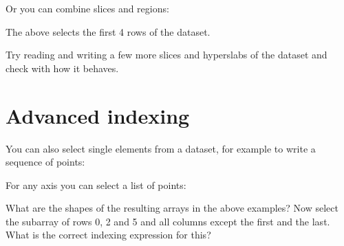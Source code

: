 \documentclass[letterpaper,10pt,english]{sphinxmanual}
\begin{document}
\sphinxAtStartPar
Or you can combine slices and regions:

\begin{sphinxVerbatim}[commandchars=\\\{\}]
\PYG{p}{[}\PYG{p}{]}
\end{sphinxVerbatim}

\sphinxAtStartPar
The above selects the first 4 rows of the dataset.

\sphinxAtStartPar
Try reading and writing a few more slices and hyperslabs of the dataset and check with  how it behaves.


\section{Advanced indexing}
\label{\detokenize{index:advanced-indexing}}
\sphinxAtStartPar
You can also select single elements from a dataset, for example to write a sequence of points:

\begin{sphinxVerbatim}[commandchars=\\\{\}]
\PYG{p}{[}   \PYG{p}{]}  \PYG{p}{[}   \PYG{p}{]}
\end{sphinxVerbatim}

\sphinxAtStartPar
For any axis you can select a list of points:

\begin{sphinxVerbatim}[commandchars=\\\{\}]
\PYG{p}{[} \PYG{p}{[}\PYG{p}{]}\PYG{p}{]}
\PYG{p}{[} \PYG{p}{[}\PYG{p}{]}\PYG{p}{]}
\end{sphinxVerbatim}

\sphinxAtStartPar
What are the shapes of the resulting arrays in the above examples? Now select the subarray of rows 0, 2 and 5 and all columns except the first and the last. What is the correct indexing expression for this?



\renewcommand{\indexname}{Index}
\printindex
\end{document}

